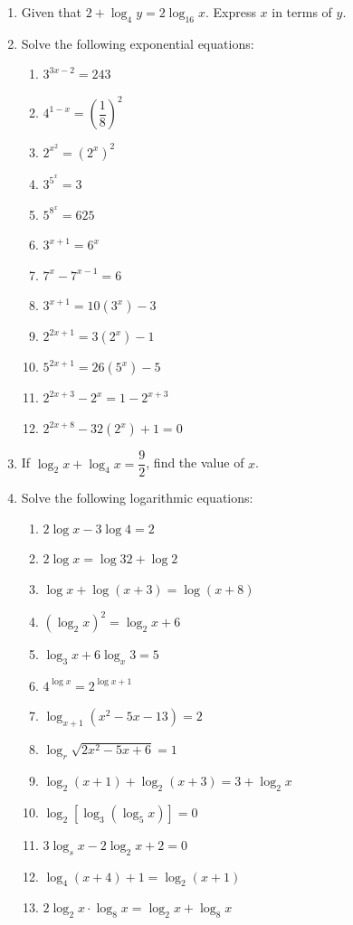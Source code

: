 \documentclass[12pt]{report}
\begin{document}
\begin{multicols}{2}
\begin{enumerate}
    \item Given that $2 + \log_4 y = 2\log_16 x$. Express $x$ in terms of $y$.

    \item Solve the following exponential equations:
          \begin{enumerate}
            \item $3^{3x-2}=243$
            \item $4^{1-x}={\left({\dfrac{1}{8}}\right)}^{2}$
            \item $2^{x^{2}}={\left(2^{x}\right)}^{2}$
            \item $3^{5^x}=3$
            \item $5^{8^x}=625$
            \item $3^{x+1}=6^{x}$
            \item $7^{x}-7^{x-1}=6$
            \item $3^{x+1}=10\left(3^x\right)-3$
            \item $2^{2x+1}=3\left(2^{x}\right)-1$
            \item $5^{2x+1}=26\left(5^{x}\right)-5$
            \item $2^{2x+3}-2^{x}=1-2^{x+3}$
            \item $2^{2x+8}-32\left(2^{x}\right)+1=0$
          \end{enumerate}

    \item If $\log_2 x + \log_4 x = \dfrac{9}{2}$, find the value of $x$.
    \item Solve the following logarithmic equations:
          \begin{enumerate}
            \item $2\log x-3\log4=2$
            \item $2\log x=\log32+\log2$
            \item $\log x+\log\left(x+3\right)=\log\left(x+8\right)$
            \item ${\left(\log_{2}x\right)}^{2}=\log_{2}x+6$
            \item $\log_{3}x+6\log_{x}3=5$
            \item $4^{\log x}=2^{\log x+1}$
            \item $\log_{x+1}\left(x^{2}-5x-13\right)=2$
            \item $\log_{r}{\sqrt{2x^{2}-5x+6}}=1$
            \item $\log_{2}(x+1)+\log_{2}(x+3)=3+\log_{2}x$
            \item $\log_{2}\left[\log_{3}\left(\log_{5}x\right)\right]=0$
            \item $3\log_{s}x-2\log_{2}x+2=0$
            \item $\log_{4}(x+4)+1=\log_{2}(x+1)$
            \item $2\log_{2}x\cdot\log_{8}x=\log_{2}x+\log_{8}x$
          \end{enumerate}


\end{enumerate}
\end{multicols}
\end{document}
